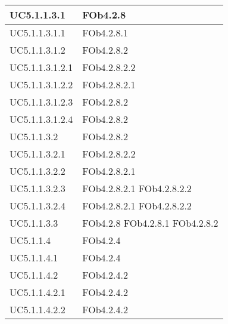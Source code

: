 \begin{longtable}{|l|l|}
\hline
		UC5.1.1.3.1 & FOb4.2.8 \linebreak   \\
\hline
		UC5.1.1.3.1.1 & FOb4.2.8.1 \linebreak   \\
\hline
		UC5.1.1.3.1.2 & FOb4.2.8.2 \linebreak   \\
\hline
		UC5.1.1.3.1.2.1 & FOb4.2.8.2.2 \linebreak   \\
\hline
		UC5.1.1.3.1.2.2 & FOb4.2.8.2.1 \linebreak   \\
\hline
		UC5.1.1.3.1.2.3 & FOb4.2.8.2 \linebreak   \\
\hline
		UC5.1.1.3.1.2.4 & FOb4.2.8.2 \linebreak   \\
\hline
		UC5.1.1.3.2 & FOb4.2.8.2 \linebreak   \\
\hline
		UC5.1.1.3.2.1 & FOb4.2.8.2.2 \linebreak   \\
\hline
		UC5.1.1.3.2.2 & FOb4.2.8.2.1 \linebreak   \\
\hline
		UC5.1.1.3.2.3 & FOb4.2.8.2.1 \linebreak  FOb4.2.8.2.2 \linebreak   \\
\hline
		UC5.1.1.3.2.4 & FOb4.2.8.2.1 \linebreak  FOb4.2.8.2.2 \linebreak   \\
\hline
		UC5.1.1.3.3 & FOb4.2.8 \linebreak  FOb4.2.8.1 \linebreak  FOb4.2.8.2 \linebreak   \\
\hline
		UC5.1.1.4 & FOb4.2.4 \linebreak   \\
\hline
		UC5.1.1.4.1 & FOb4.2.4 \linebreak   \\
\hline
		UC5.1.1.4.2 & FOb4.2.4.2 \linebreak   \\
\hline
		UC5.1.1.4.2.1 & FOb4.2.4.2 \linebreak   \\
\hline
		UC5.1.1.4.2.2 & FOb4.2.4.2 \linebreak   \\

\end{longtable}
